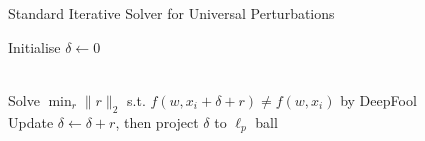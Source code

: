 
\begin{algorithm}
\caption{Standard Iterative Solver for Universal Perturbations}\label{Alg_1}
\begin{algorithmic}[1]
\State Initialise $\delta \gets 0$



 \\ 
\hspace{\algorithmicindent} Solve $\min_r \|r\|_2$ s.t.  $f(w,x_i+\delta+r) \neq f(w,x_i)$ by DeepFool \\
\hspace{\algorithmicindent} Update $\delta \gets \delta + r$, then project $\delta$ to $\ell_p$ ball
\EndIf
\EndFor
\EndWhile



\end{algorithmic}
\end{algorithm}

